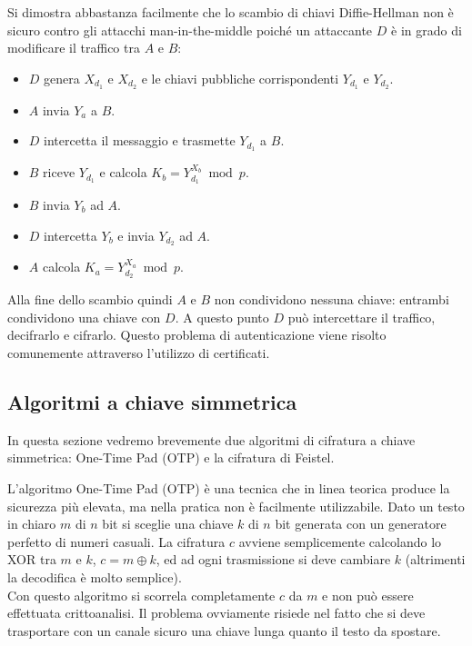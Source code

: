 Si dimostra abbastanza facilmente che lo scambio di chiavi Diffie-Hellman non è sicuro contro gli attacchi man-in-the-middle poiché un attaccante $D$ è in grado di modificare il traffico tra $A$ e $B$:
\begin{itemize}
	\item $D$ genera $X_{d_1}$ e $X_{d_2}$ e le chiavi pubbliche corrispondenti $Y_{d_1}$ e $Y_{d_2}$.
	\item $A$ invia $Y_a$ a $B$.
	\item $D$ intercetta il messaggio e trasmette $Y_{d_1}$ a $B$.
	\item $B$ riceve $Y_{d_1}$ e calcola $K_b = Y_{d_1}^{X_b} \bmod p$.
	\item $B$ invia $Y_b$ ad $A$.
	\item $D$ intercetta $Y_b$ e invia $Y_{d_2}$ ad $A$.
	\item $A$ calcola $K_a = Y_{d_2}^{X_a} \bmod p$.
\end{itemize}
Alla fine dello scambio quindi $A$ e $B$ non condividono nessuna chiave: entrambi condividono una chiave con $D$. A questo punto $D$ può intercettare il traffico, decifrarlo e cifrarlo. Questo problema di autenticazione viene risolto comunemente attraverso l'utilizzo di certificati.

\subsection{Algoritmi a chiave simmetrica}
In questa sezione vedremo brevemente due algoritmi di cifratura a chiave simmetrica: One-Time Pad (OTP) e la cifratura di Feistel.

L'algoritmo One-Time Pad (OTP) è una tecnica che in linea teorica produce la sicurezza più elevata, ma nella pratica non è facilmente utilizzabile. Dato un testo in chiaro $m$ di $n$ bit si sceglie una chiave $k$ di $n$ bit generata con un generatore perfetto di numeri casuali. La cifratura $c$ avviene semplicemente calcolando lo XOR tra $m$ e $k$, $c=m\oplus k$, ed ad ogni trasmissione si deve cambiare $k$ (altrimenti la decodifica è molto semplice).\\
Con questo algoritmo si scorrela completamente $c$ da $m$ e non può essere effettuata crittoanalisi. Il problema ovviamente risiede nel fatto che si deve trasportare con un canale sicuro una chiave lunga quanto il testo da spostare.

